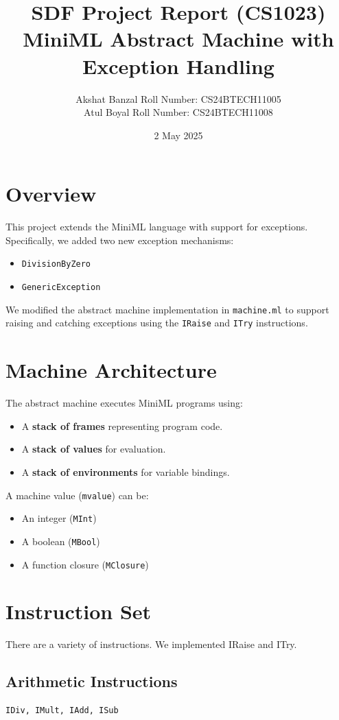 \documentclass[11pt]{article}
\title{\textbf{SDF Project Report (CS1023)\\MiniML Abstract Machine with Exception Handling}}
\author{Akshat Banzal \quad Roll Number: CS24BTECH11005 \\
Atul Boyal \quad   Roll Number: CS24BTECH11008 \\}
\date{2 May 2025}
\begin{document}
\maketitle

\section{Overview}
This project extends the MiniML language with support for exceptions. Specifically, we added two new exception mechanisms:
\begin{itemize}
    \item \texttt{DivisionByZero}
    \item \texttt{GenericException}
\end{itemize}
We modified the abstract machine implementation in \texttt{machine.ml} to support raising and catching exceptions using the \texttt{IRaise} and \texttt{ITry} instructions.

\section{Machine Architecture}
The abstract machine executes MiniML programs using:
\begin{itemize}
    \item A \textbf{stack of frames} representing program code.
    \item A \textbf{stack of values} for evaluation.
    \item A \textbf{stack of environments} for variable bindings.
\end{itemize}

A machine value (\texttt{mvalue}) can be:
\begin{itemize}
    \item An integer (\texttt{MInt})
    \item A boolean (\texttt{MBool})
    \item A function closure (\texttt{MClosure})
\end{itemize}

\section{Instruction Set}
There are a variety of instructions. We implemented IRaise and ITry.\subsection*{Arithmetic Instructions}
\begin{lstlisting}
IDiv, IMult, IAdd, ISub
\end{lstlisting}
\end{document}
